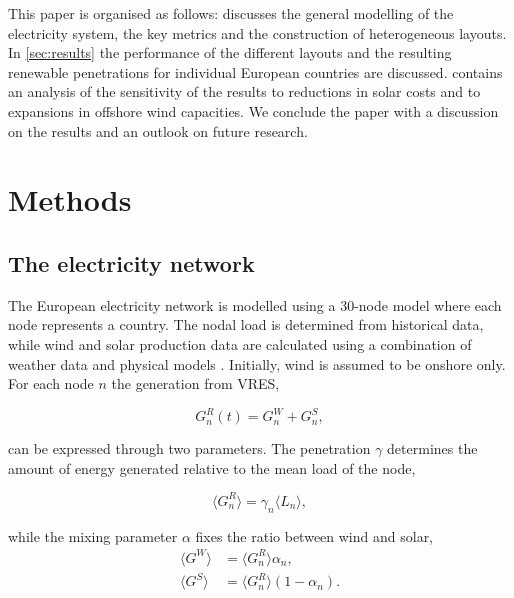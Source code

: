 \documentclass[a4paper, 5p, sort&compress]{elsarticle}%
\newcommand{\mean}[1]{\langle #1 \rangle}
\newcommand{\paren}[1]{\left(#1\right)}
\begin{document}
This paper is organised as follows:  discusses the
general modelling of the electricity system, the key metrics and the
construction of heterogeneous layouts. In \cref{sec:results} the
performance of the different layouts and the resulting renewable
penetrations for individual European countries are
discussed.  contains an analysis of the
sensitivity of the results to reductions in solar costs and to
expansions in offshore wind capacities. We conclude the paper with a
discussion on the results and an outlook on future research.

\section{Methods}
\label{sec:two}
\subsection{The electricity network}

The European electricity network is modelled using a 30-node model
where each node represents a country. The nodal load is determined
from historical data, while wind and solar production data are
calculated using a combination of weather data and physical
models \cite{REA}. Initially, wind is assumed to be onshore only. For
each node $n$ the generation from VRES,

\begin{equation}
  G^{R}_{n}(t) = G_{n}^{W} + G_{n}^{S},
\end{equation} 

can be expressed through two parameters. The penetration $\gamma$
determines the amount of energy generated relative to the mean load of
the node,

\begin{equation}
  \mean{G^{R}_{n}} = \gamma_{n} \mean{L_{n}} ,
\end{equation} 

while the mixing parameter $\alpha$ fixes the ratio between wind and solar,
\begin{align}
  \mean{G^{W}} &= \mean{G_{n}^{R}} \alpha_{n}  , \\
  \mean{G^{S}} &= \mean{G_{n}^{R}} \paren{1- \alpha_{n}}  .
\end{align} 
\end{document}

